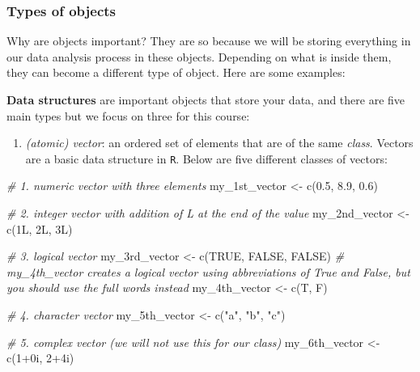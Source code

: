 \documentclass[
]{book}
\newenvironment{Shaded}{\begin{snugshade}}{\end{snugshade}}
\newcommand{\CommentTok}[1]{\textcolor[rgb]{0.56,0.35,0.01}{\textit{#1}}}
\newcommand{\ConstantTok}[1]{\textcolor[rgb]{0.00,0.00,0.00}{#1}}
\newcommand{\DecValTok}[1]{\textcolor[rgb]{0.00,0.00,0.81}{#1}}
\newcommand{\FloatTok}[1]{\textcolor[rgb]{0.00,0.00,0.81}{#1}}
\newcommand{\FunctionTok}[1]{\textcolor[rgb]{0.00,0.00,0.00}{#1}}
\newcommand{\NormalTok}[1]{#1}
\newcommand{\OtherTok}[1]{\textcolor[rgb]{0.56,0.35,0.01}{#1}}
\newcommand{\SpecialCharTok}[1]{\textcolor[rgb]{0.00,0.00,0.00}{#1}}
\newcommand{\StringTok}[1]{\textcolor[rgb]{0.31,0.60,0.02}{#1}}
\providecommand{\tightlist}{%
  \setlength{\itemsep}{0pt}\setlength{\parskip}{0pt}}
\begin{document}
\hypertarget{types-of-objects}{%
\subsubsection{Types of objects}\label{types-of-objects}}

Why are objects important? They are so because we will be storing everything in our data analysis process in these objects. Depending on what is inside them, they can become a different type of object. Here are some examples:

\textbf{Data structures} are important objects that store your data, and there are five main types but we focus on three for this course:

\begin{enumerate}
\def\labelenumi{\arabic{enumi}.}
\tightlist
\item
  \emph{(atomic) vector}: an ordered set of elements that are of the same \emph{class}. Vectors are a basic data structure in \texttt{R}. Below are five different classes of vectors:
\end{enumerate}

\begin{Shaded}
\begin{Highlighting}[]
\CommentTok{\# 1. numeric vector with three elements}
\NormalTok{my\_1st\_vector }\OtherTok{\textless{}{-}} \FunctionTok{c}\NormalTok{(}\FloatTok{0.5}\NormalTok{, }\FloatTok{8.9}\NormalTok{, }\FloatTok{0.6}\NormalTok{) }

\CommentTok{\# 2. integer vector with addition of L at the end of the value}
\NormalTok{my\_2nd\_vector }\OtherTok{\textless{}{-}} \FunctionTok{c}\NormalTok{(1L, 2L, 3L)  }

\CommentTok{\# 3. logical vector}
\NormalTok{my\_3rd\_vector }\OtherTok{\textless{}{-}} \FunctionTok{c}\NormalTok{(}\ConstantTok{TRUE}\NormalTok{, }\ConstantTok{FALSE}\NormalTok{, }\ConstantTok{FALSE}\NormalTok{) }
\CommentTok{\# \textquotesingle{}my\_4th\_vector\textquotesingle{} creates a logical vector using abbreviations of True and False, but you should use the full words instead}
\NormalTok{my\_4th\_vector }\OtherTok{\textless{}{-}} \FunctionTok{c}\NormalTok{(T, F) }

\CommentTok{\# 4. character vector}
\NormalTok{my\_5th\_vector }\OtherTok{\textless{}{-}} \FunctionTok{c}\NormalTok{(}\StringTok{"a"}\NormalTok{, }\StringTok{"b"}\NormalTok{, }\StringTok{"c"}\NormalTok{) }

\CommentTok{\# 5. complex vector (we will not use this for our class)}
\NormalTok{my\_6th\_vector }\OtherTok{\textless{}{-}} \FunctionTok{c}\NormalTok{(}\DecValTok{1}\SpecialCharTok{+}\NormalTok{0i, }\DecValTok{2}\SpecialCharTok{+}\NormalTok{4i) }
\end{Highlighting}
\end{Shaded}
\end{document}
